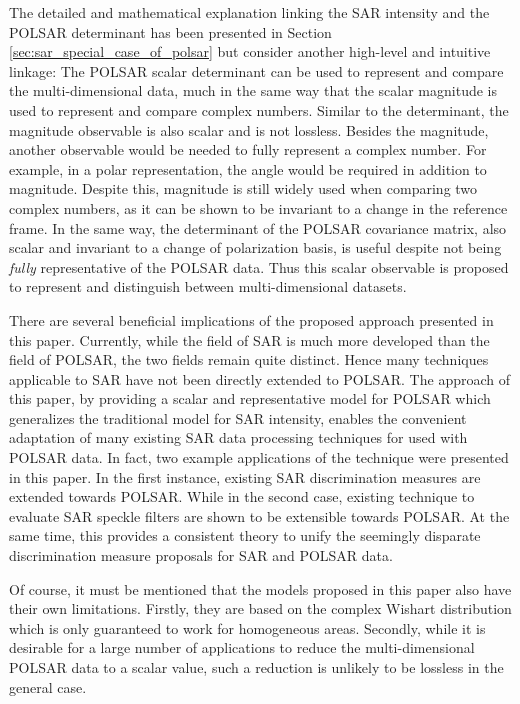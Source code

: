 \documentclass[journal]{IEEEtran}
\begin{document}
The detailed and mathematical explanation linking the SAR intensity and the POLSAR determinant has been presented in Section \ref{sec:sar_special_case_of_polsar} but consider another high-level and intuitive linkage:
The POLSAR scalar determinant can be used to represent and compare the multi-dimensional data,
  much in the same way that the scalar magnitude is used to represent and compare complex numbers.
Similar to the determinant, the magnitude observable is also scalar and is not lossless.
Besides the magnitude, another observable would be needed to fully represent a complex number.
For example, in a polar representation, the angle would be required in addition to magnitude.
Despite this, magnitude is still widely used when comparing two complex numbers, as it can be shown to be invariant to a change in the reference frame.
In the same way, the determinant of the POLSAR covariance matrix, also scalar and invariant to a change of polarization basis, is useful despite not being \textit{fully} representative of the POLSAR data. 
Thus this scalar observable is proposed to represent and distinguish between multi-dimensional datasets.

There are several beneficial implications of the proposed approach presented in this paper.
Currently, while the field of SAR is much more developed than the field of POLSAR,  the two fields remain quite distinct.
Hence many techniques applicable to SAR have not been directly extended to POLSAR.
The approach of this paper, by providing a scalar and representative model for POLSAR which generalizes the traditional model for SAR intensity, enables the convenient adaptation of many existing SAR data processing techniques for used with POLSAR data.
In fact, two example applications of the technique were presented in this paper. 
  In the first instance, existing SAR discrimination measures are extended towards POLSAR.
  While in the second case, existing technique to evaluate SAR speckle filters are shown to be extensible towards POLSAR.
At the same time, this provides a consistent theory to unify the seemingly disparate discrimination measure proposals for SAR and POLSAR data.  

Of course, it must be mentioned that the models proposed in this paper also have their own limitations.
Firstly, they are based on the complex Wishart distribution
  which is only guaranteed to work for homogeneous areas.
Secondly, while it is desirable for a large number of applications to reduce the multi-dimensional POLSAR data to a scalar value, such a reduction is unlikely to be lossless in the general case.
\end{document}
